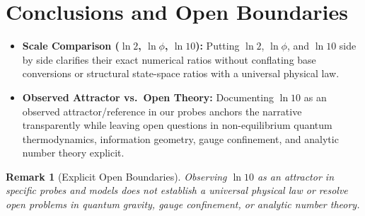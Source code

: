 \documentclass[11pt,a4paper]{article}
\newtheorem{remark}{Remark}
\begin{document}
\section{Conclusions and Open Boundaries}
\begin{itemize}
  \item \textbf{Scale Comparison ($\ln 2$, $\ln \phi$, $\ln 10$):} Putting $\ln 2$, $\ln \phi$, and $\ln 10$ side by side clarifies their exact numerical ratios without conflating base conversions or structural state-space ratios with a universal physical law.
  \item \textbf{Observed Attractor vs.\ Open Theory:} Documenting $\ln 10$ as an observed attractor/reference in our probes anchors the narrative transparently while leaving open questions in non-equilibrium quantum thermodynamics, information geometry, gauge confinement, and analytic number theory explicit.
\end{itemize}

\begin{remark}[Explicit Open Boundaries]
Observing $\ln 10$ as an attractor in specific probes and models does not establish a universal physical law or resolve open problems in quantum gravity, gauge confinement, or analytic number theory.
\end{remark}
\end{document}
